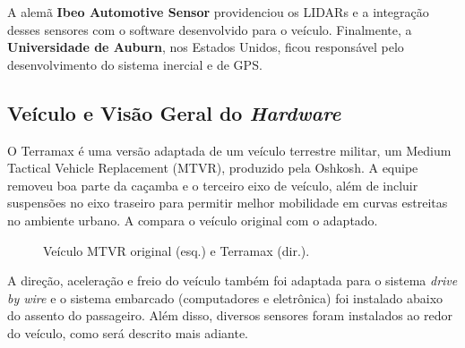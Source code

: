 A alemã \textbf{Ibeo Automotive Sensor} providenciou os LIDARs e a integração desses sensores com o software desenvolvido para o veículo. Finalmente, a \textbf{Universidade de Auburn}, nos Estados Unidos, ficou responsável pelo desenvolvimento do sistema inercial e de GPS.

\subsection{Veículo e Visão Geral do \emph{Hardware}}

O Terramax é uma versão adaptada de um veículo terrestre militar, um Medium Tactical Vehicle Replacement (MTVR), produzido pela Oshkosh. A equipe removeu boa parte da caçamba e o terceiro eixo de veículo, além de incluir suspensões no eixo traseiro para permitir melhor mobilidade em curvas estreitas no ambiente urbano. A  compara o veículo original com o adaptado.

\begin{figure}[h]
\centering
{}\enskip
{}
\caption{Veículo MTVR original (esq.) e Terramax (dir.).}%
\label{fig:veiculo}%
\end{figure}

A direção, aceleração e freio do veículo também foi adaptada para o sistema \emph{drive by wire} e o sistema embarcado (computadores e eletrônica) foi instalado abaixo do assento do passageiro. Além disso, diversos sensores foram instalados ao redor do veículo, como será descrito mais adiante.

